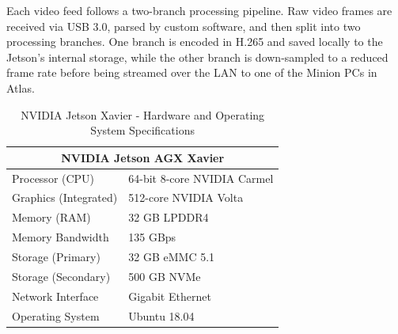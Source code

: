 \documentclass{erauthesis}
\begin{document}
Each video feed follows a two-branch processing pipeline.  
Raw video frames are received via USB 3.0, parsed by custom software, and then split into two processing branches. 
One branch is encoded in H.265 and saved locally to the Jetson's internal storage, while the other branch is down-sampled to a reduced frame rate before being streamed over the \ac{LAN} to one of the Minion PCs in Atlas.





\begin{table}[htpb]
\centering
\begin{tabular}{ll}
\hline
\multicolumn{2}{c}{NVIDIA Jetson AGX Xavier} \\
\hline
\hline
Processor (CPU) & 64-bit 8-core NVIDIA Carmel \\
Graphics (Integrated) & 512-core NVIDIA Volta \\
Memory (RAM) & 32 GB LPDDR4 \\
Memory Bandwidth & 135 GBps \\
Storage (Primary) & 32 GB eMMC 5.1 \\
Storage (Secondary) & 500 GB NVMe \\
Network Interface & Gigabit Ethernet \\
Operating System & Ubuntu 18.04 \\
\hline
\end{tabular}
\caption{NVIDIA Jetson Xavier - Hardware and Operating System Specifications}
\label{table:Xavier_hardware}
\end{table}
\end{document}
